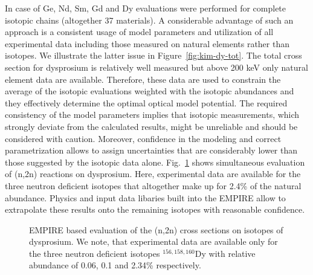 \documentclass[twocolumn,amsmath,amssymb,10pt,groupedaddress,a4paper]{revtex4}
\begin{document}
In case of Ge, Nd, Sm, Gd and Dy evaluations were performed for complete isotopic chains (altogether 37 materials). A considerable advantage of such an approach is a consistent usage of model parameters and utilization of all experimental data including those measured on natural elements rather than isotopes. We illustrate the latter issue in Figure~\ref{fig:kim-dy-tot}.  The total cross section for dysprosium is relatively well measured but above 200 keV only natural element data are available. Therefore, these data are used to constrain the average of the isotopic evaluations weighted with the isotopic abundances and they effectively determine the optimal optical model potential. The required consistency of the model parameters implies that isotopic measurements, which strongly deviate from the calculated results, might be unreliable and should be considered with caution. Moreover, confidence in the modeling and correct parametrization allows to assign uncertainties that are considerably lower than those suggested by the isotopic data alone. Fig.~\ref{fig:kim-dy-n2n} shows simultaneous evaluation of (n,2n) reactions on dysprosium. Here, experimental data are available for the three neutron deficient isotopes that altogether make up for 2.4\% of the natural abundance. Physics and input data libaries built into the EMPIRE allow to extrapolate these results onto the remaining isotopes with reasonable confidence.

\begin{figure*}[htbp]
\caption{\label{fig:kim-dy-tot} EMPIRE based evaluation of total cross sections on isotopes of dysprosium. The left panel shows the comparison of data measured on the natural element with the adequate average of the isotopic cross sections plotted in the right panel.}
\end{figure*}

\begin{figure}[htbp]
\caption{\label{fig:kim-dy-n2n} EMPIRE based evaluation of the (n,2n) cross sections on isotopes of dysprosium. We note, that experimental data are available only for the three neutron deficient isotopes  $^{156,158,160}$Dy with relative abundance of 0.06, 0.1 and 2.34\% respectively.}
\end{figure}
\end{document}

